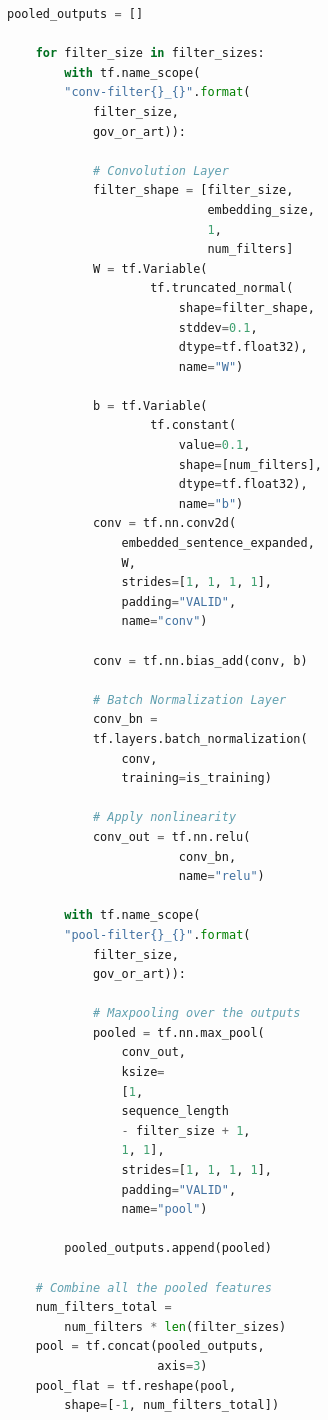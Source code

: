 \documentclass[sigconf]{acmart}
\begin{document}
\begin{appendices}
\begin{lstlisting}[language=Python, frame=tlrb]
    pooled_outputs = []
    
    for filter_size in filter_sizes:
        with tf.name_scope(
        "conv-filter{}_{}".format(
            filter_size,
            gov_or_art)):
            
            # Convolution Layer
            filter_shape = [filter_size,
                            embedding_size,
                            1,
                            num_filters]
            W = tf.Variable(
                    tf.truncated_normal(
                        shape=filter_shape, 
                        stddev=0.1, 
                        dtype=tf.float32),
                        name="W")
                  
            b = tf.Variable(
                    tf.constant(
                        value=0.1,
                        shape=[num_filters],
                        dtype=tf.float32),
                        name="b")
            conv = tf.nn.conv2d(
                embedded_sentence_expanded,
                W,
                strides=[1, 1, 1, 1],
                padding="VALID",
                name="conv")
            
            conv = tf.nn.bias_add(conv, b)
            
            # Batch Normalization Layer
            conv_bn =
            tf.layers.batch_normalization(
                conv,
                training=is_training)
            
            # Apply nonlinearity
            conv_out = tf.nn.relu(
                        conv_bn,
                        name="relu")
        
        with tf.name_scope(
        "pool-filter{}_{}".format(
            filter_size,
            gov_or_art)):
            
            # Maxpooling over the outputs
            pooled = tf.nn.max_pool(
                conv_out,
                ksize=
                [1, 
                sequence_length 
                - filter_size + 1, 
                1, 1],
                strides=[1, 1, 1, 1],
                padding="VALID",
                name="pool")
        
        pooled_outputs.append(pooled)
    
    # Combine all the pooled features
    num_filters_total = 
        num_filters * len(filter_sizes)
    pool = tf.concat(pooled_outputs,
                     axis=3)
    pool_flat = tf.reshape(pool,
        shape=[-1, num_filters_total])
    

\end{lstlisting}
\end{appendices}
\end{document}
